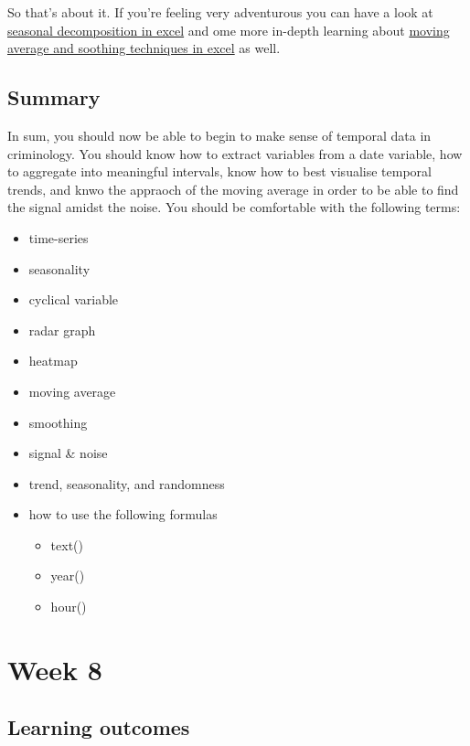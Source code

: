 \documentclass[]{book}
\providecommand{\tightlist}{%
  \setlength{\itemsep}{0pt}\setlength{\parskip}{0pt}}
\theoremstyle{definition}
\theoremstyle{definition}
\theoremstyle{definition}
\theoremstyle{remark}
\begin{document}
So that's about it. If you're feeling very adventurous you can have a
look at
\href{https://www.searchlaboratory.com/2013/09/time-series-decomposition-using-excel/}{seasonal
decomposition in excel} and ome more in-depth learning about
\href{http://www.informit.com/articles/article.aspx?p=2433607}{moving
average and soothing techniques in excel} as well.

\hypertarget{summary-6}{%
\section{Summary}\label{summary-6}}

In sum, you should now be able to begin to make sense of temporal data
in criminology. You should know how to extract variables from a date
variable, how to aggregate into meaningful intervals, know how to best
visualise temporal trends, and knwo the appraoch of the moving average
in order to be able to find the signal amidst the noise. You should be
comfortable with the following terms:

\begin{itemize}
\tightlist
\item
  time-series
\item
  seasonality
\item
  cyclical variable
\item
  radar graph
\item
  heatmap
\item
  moving average
\item
  smoothing
\item
  signal \& noise
\item
  trend, seasonality, and randomness
\item
  how to use the following formulas

  \begin{itemize}
  \tightlist
  \item
    text()
  \item
    year()
  \item
    hour()
  \end{itemize}
\end{itemize}

\hypertarget{week8}{%
\chapter{Week 8}\label{week8}}

\hypertarget{learning-outcomes-7}{%
\section{Learning outcomes}\label{learning-outcomes-7}}
\end{document}
